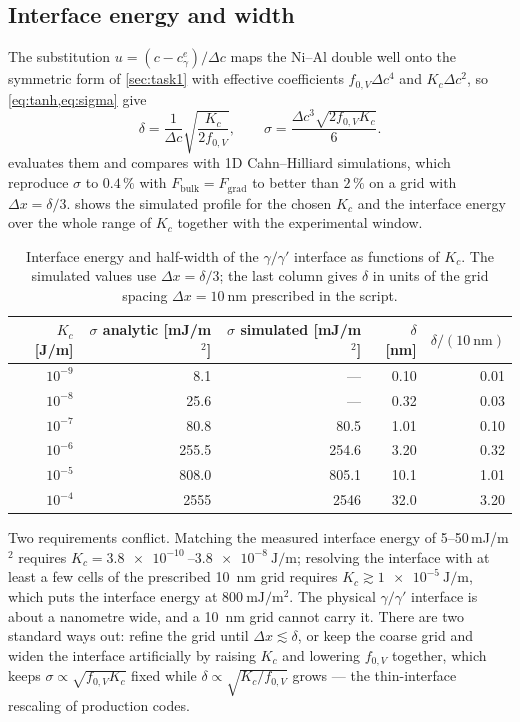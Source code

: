 \documentclass[11pt,a4paper]{article}
\numberwithin{equation}{section}
\theoremstyle{remark}
\newcommand{\cg}{c^{e}_{\gamma}}
\begin{document}
\subsection{Interface energy and width}\label{sec:kc}

The substitution $u = (c - \cg)/\Delta c$ maps the Ni--Al double well onto the symmetric form of
\cref{sec:task1} with effective coefficients $f_{0,V}\Delta c^4$ and $K_c\Delta c^2$, so
\cref{eq:tanh,eq:sigma} give
\begin{equation}\label{eq:kcrel}
  \delta = \frac{1}{\Delta c}\sqrt{\frac{K_c}{2f_{0,V}}},
  \qquad
  \sigma = \frac{\Delta c^3\sqrt{2f_{0,V}K_c}}{6}.
\end{equation}
 evaluates them and compares with 1D Cahn--Hilliard simulations, which reproduce $\sigma$
to $0.4\,\%$ with $F_{\mathrm{bulk}} = F_{\mathrm{grad}}$ to better than $2\,\%$ on a grid with
$\Delta x = \delta/3$.  shows the simulated profile for the chosen $K_c$ and the interface
energy over the whole range of $K_c$ together with the experimental window.

\begin{table}[ht]
  \centering
  \caption{Interface energy and half-width of the $\gamma/\gamma'$ interface as functions of $K_c$.
    The simulated values use $\Delta x = \delta/3$; the last column gives $\delta$ in units of
    the grid spacing $\Delta x = \SI{10}{\nano\metre}$ prescribed in the script.}
  \label{tab:kc}
  \begin{tabular}{rrrrr}
    \toprule
    $K_c$ [J/m] & $\sigma$ analytic [mJ/m$^2$] & $\sigma$ simulated [mJ/m$^2$] & $\delta$ [nm]
      & $\delta/(\SI{10}{\nano\metre})$ \\
    \midrule
    $10^{-9}$ & 8.1    & ---    & 0.10 & 0.01 \\
    $10^{-8}$ & 25.6   & ---    & 0.32 & 0.03 \\
    $10^{-7}$ & 80.8   & 80.5   & 1.01 & 0.10 \\
    $10^{-6}$ & 255.5  & 254.6  & 3.20 & 0.32 \\
    $10^{-5}$ & 808.0  & 805.1  & 10.1 & 1.01 \\
    $10^{-4}$ & 2555   & 2546   & 32.0 & 3.20 \\
    \bottomrule
  \end{tabular}
\end{table}

Two requirements conflict. Matching the measured interface energy of 5--50\,mJ/m$^2$ requires
$K_c = \SI{3.8e-10}{}$--$\SI{3.8e-8}{\joule\per\metre}$; resolving the interface with at least a few
cells of the prescribed \SI{10}{\nano\metre} grid requires $K_c \gtrsim \SI{1e-5}{\joule\per\metre}$,
which puts the interface energy at $\SI{800}{\milli\joule\per\metre\squared}$. The physical
$\gamma/\gamma'$ interface is about a nanometre wide, and a \SI{10}{\nano\metre} grid cannot carry it.
There are two standard ways out: refine the grid until $\Delta x \lesssim \delta$, or keep the coarse
grid and widen the interface artificially by raising $K_c$ and lowering $f_{0,V}$ together, which keeps
$\sigma\propto\sqrt{f_{0,V}K_c}$ fixed while $\delta\propto\sqrt{K_c/f_{0,V}}$ grows --- the
thin-interface rescaling of production codes.
\end{document}
